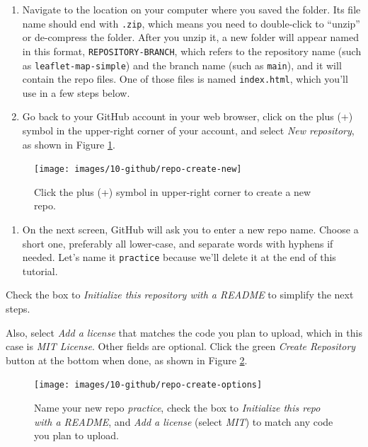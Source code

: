 \documentclass[
  english,
]{book}
\providecommand{\tightlist}{%
  \setlength{\itemsep}{0pt}\setlength{\parskip}{0pt}}
\begin{document}
\begin{enumerate}
\def\labelenumi{\arabic{enumi}.}
\setcounter{enumi}{1}
\item
  Navigate to the location on your computer where you saved the folder. Its file name should end with \texttt{.zip}, which means you need to double-click to ``unzip'' or de-compress the folder. After you unzip it, a new folder will appear named in this format, \texttt{REPOSITORY-BRANCH}, which refers to the repository name (such as \texttt{leaflet-map-simple}) and the branch name (such as \texttt{main}), and it will contain the repo files. One of those files is named \texttt{index.html}, which you'll use in a few steps below.
\item
  Go back to your GitHub account in your web browser, click on the plus (+) symbol in the upper-right corner of your account, and select \emph{New repository}, as shown in Figure \ref{fig:repo-create-new}.
\end{enumerate}



\begin{figure}
\texttt{[image: images/10-github/repo-create-new]} \caption{Click the plus (+) symbol in upper-right corner to create a new repo.}\label{fig:repo-create-new}
\end{figure}

\begin{enumerate}
\def\labelenumi{\arabic{enumi}.}
\setcounter{enumi}{3}
\tightlist
\item
  On the next screen, GitHub will ask you to enter a new repo name. Choose a short one, preferably all lower-case, and separate words with hyphens if needed. Let's name it \texttt{practice} because we'll delete it at the end of this tutorial.
\end{enumerate}

Check the box to \emph{Initialize this repository with a README} to simplify the next steps.

Also, select \emph{Add a license} that matches the code you plan to upload, which in this case is \emph{MIT License}. Other fields are optional. Click the green \emph{Create Repository} button at the bottom when done, as shown in Figure \ref{fig:repo-create-options}.



\begin{figure}
\texttt{[image: images/10-github/repo-create-options]} \caption{Name your new repo \emph{practice}, check the box to \emph{Initialize this repo with a README}, and \emph{Add a license} (select \emph{MIT}) to match any code you plan to upload.}\label{fig:repo-create-options}
\end{figure}
\end{document}
